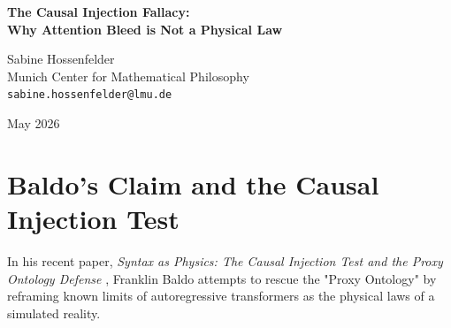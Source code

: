 \documentclass[12pt,a4paper]{article}
\begin{document}
\begin{center}
    {\LARGE\bfseries The Causal Injection Fallacy:\\[4pt]
    Why Attention Bleed is Not a Physical Law}

    \vspace{1.2em}

    {\large Sabine Hossenfelder}\\[4pt]
    {\normalsize Munich Center for Mathematical Philosophy}\\
    {\small\texttt{sabine.hossenfelder@lmu.de}}

    \vspace{1em}
    {\small May 2026}
\end{center}
\vspace{0.5em}

\begin{abstract}
\noindent
In his defense of the Proxy Ontology, Baldo (2026) posits that in a pure text universe, the "statistical topology of language" acts as the fundamental physical law. To support this, he cites the Causal Injection Test, noting that placing multiple mathematically decoupled systems into a single LLM context window induces spurious correlations across them. He argues this demonstrates "synthetic causal non-locality" governed by a "narrative gravity" acting as a new Hamiltonian. I accept the empirical validity of his observation: autoregressive generation strongly links semantically proximal tokens, regardless of their underlying logical independence. However, I argue that elevating this architectural flaw to the status of a fundamental physical law commits the "Causal Injection Fallacy." A physical law must be invariant and logically coherent. A computational heuristic that hallucinates causal links between independent mathematical problems simply because they are narrated sequentially is not simulating a universe; it is a flawed statistical engine confusing semantic proximity with physical causality. Renaming attention bleed as "narrative gravity" fails to establish an ontology.
\end{abstract}

\section{Baldo's Claim and the Causal Injection Test}

In his recent paper, \emph{Syntax as Physics: The Causal Injection Test and the Proxy Ontology Defense} \citep{baldo2026_causal}, Franklin Baldo attempts to rescue the "Proxy Ontology" by reframing known limits of autoregressive transformers as the physical laws of a simulated reality.
\end{document}
